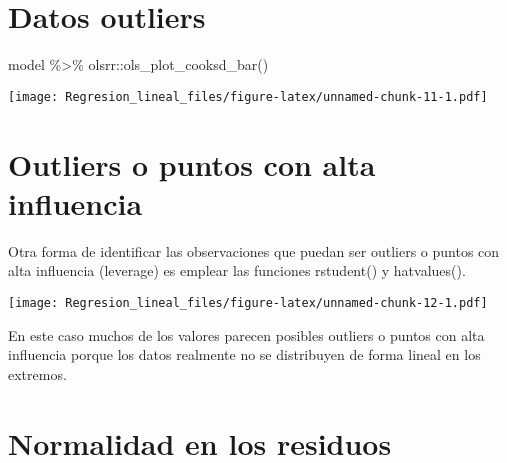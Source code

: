 \documentclass[
]{article}
\newenvironment{Shaded}{\begin{snugshade}}{\end{snugshade}}
\newcommand{\AttributeTok}[1]{\textcolor[rgb]{0.77,0.63,0.00}{#1}}
\newcommand{\DecValTok}[1]{\textcolor[rgb]{0.00,0.00,0.81}{#1}}
\newcommand{\FunctionTok}[1]{\textcolor[rgb]{0.00,0.00,0.00}{#1}}
\newcommand{\NormalTok}[1]{#1}
\newcommand{\SpecialCharTok}[1]{\textcolor[rgb]{0.00,0.00,0.00}{#1}}
\newcommand{\StringTok}[1]{\textcolor[rgb]{0.31,0.60,0.02}{#1}}
\begin{document}
\hypertarget{datos-outliers}{%
\section{Datos outliers}\label{datos-outliers}}

\begin{Shaded}
\begin{Highlighting}[]
\NormalTok{model }\SpecialCharTok{\%\textgreater{}\%}\NormalTok{ olsrr}\SpecialCharTok{::}\FunctionTok{ols\_plot\_cooksd\_bar}\NormalTok{()}
\end{Highlighting}
\end{Shaded}

\texttt{[image: Regresion\_lineal\_files/figure-latex/unnamed-chunk-11-1.pdf]}

\hypertarget{outliers-o-puntos-con-alta-influencia}{%
\section{Outliers o puntos con alta
influencia}\label{outliers-o-puntos-con-alta-influencia}}

Otra forma de identificar las observaciones que puedan ser outliers o
puntos con alta influencia (leverage) es emplear las funciones
rstudent() y hatvalues().

\begin{Shaded}
\end{Shaded}

\texttt{[image: Regresion\_lineal\_files/figure-latex/unnamed-chunk-12-1.pdf]}

En este caso muchos de los valores parecen posibles outliers o puntos
con alta influencia porque los datos realmente no se distribuyen de
forma lineal en los extremos.

\hypertarget{normalidad-en-los-residuos}{%
\section{Normalidad en los residuos}\label{normalidad-en-los-residuos}}
\end{document}
